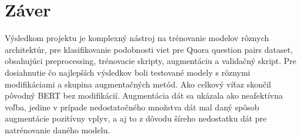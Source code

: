 \documentclass[a4paper, 16pt]{article}
\begin{document}

\section{Záver}
\label{zaver}
Výsledkom projektu je komplexný nástroj na trénovanie modelov rôznych architektúr, pre klasifikovanie podobnosti viet pre Quora question pairs dataset, obsahujúci preprocessing, trénovacie skripty, augmentáciu a validačný skript.  Pre dosiahnutie čo najlepších výsledkov boli testované modely s rôznymi modifikáciami a skupina augmentačných metód. Ako celkový víťaz skončil pôvodný BERT bez modifikácií. Augmentácia dát sa ukázala ako neafektívna voľba, jedine v prípade nedostatočného množstva dát mal daný spôsob augmentácie pozitívny vplyv, a aj to z dôvodu šíreho nedostatku dát pre natrénovanie daného modelu. 



\begin{flushleft}
  
\end{flushleft}

\end{document}
